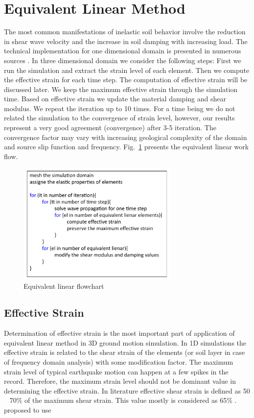 
\section{Equivalent Linear Method}

The most common manifestations of inelastic soil behavior involve the reduction in shear wave velocity and the increase in soil damping with increasing load. The technical implementation for one dimensional domain is presented in numerous sources \citep[e.g.,][]{Kramer1996geotechnical}. In three dimensional domain we consider the following steps: First we run the simulation and extract the strain level of each element. Then we compute the effective strain for each time step. The computation of effective strain will be discussed later. We keep the maximum effective strain through the simulation time. Based on effective strain we update the material damping and shear modulus. We repeat the iteration up to 10 times. For a time being we do not related the simulation to the convergence of strain level, however, our results represent a very good agreement (convergence) after 3-5 iteration. The convergence factor may vary with increasing geological complexity of the domain and source slip function and frequency. Fig.~\ref{fig:equivalent_linear_flowchart} presents the equivalent linear work flow. 

\begin{figure}[H]
    \centering
    \includegraphics[width=300px]{figures/pdf/equivalent_linear_flowchart.pdf}
    \caption{Equivalent linear flowchart}
    \label{fig:equivalent_linear_flowchart}
\end{figure}


\subsection{Effective Strain}

Determination of effective strain is the most important part of application of equivalent linear method in 3D ground motion simulation. In 1D simulations the effective strain is related to the shear strain of the elements (or soil layer in case of frequency domain analysis) with some modification factor. The maximum strain level of typical earthquake motion can happen at a few spikes in the record. Therefore, the maximum strain level should not be dominant value in determining the effective strain. In literature effective shear strain is defined as 50 ~ 70\% of the maximum shear strain. This value mostly is considered as 65\% \citep{Kramer1996geotechnical}.  \citet{Idriss1992} proposed to use 

